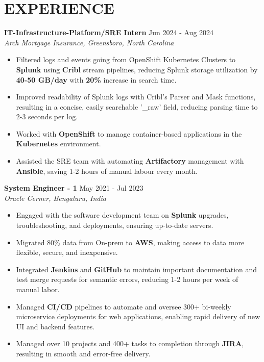 \documentclass[a4paper,9pt]{extarticle}
\begin{document}
\section*{EXPERIENCE}
\noindent
\textbf{IT-Infrastructure-Platform/SRE Intern}
\hfill Jun 2024 - Aug 2024\\ %
\textit{Arch Mortgage Insurance, Greensboro, North Carolina}
\begin{itemize}
    \item Filtered logs and events going from OpenShift Kubernetes Clusters to \textbf{Splunk} using \textbf{Cribl} stream pipelines, reducing Splunk storage utilization by \textbf{40-50 GB/day} with \textbf{20\%} increase in search time.
    \item Improved readability of Splunk logs with Cribl's Parser and Mask functions, resulting in a concise, easily searchable '\_raw' field, reducing parsing time to 2-3 seconds per log.
    \item Worked with \textbf{OpenShift} to manage container-based applications in the \textbf{Kubernetes} environment.
    \item Assisted the SRE team with automating \textbf{Artifactory} management with \textbf{Ansible}, saving 1-2 hours of manual labour every month.
    

\end{itemize}

\noindent
\textbf{System Engineer - 1}
\hfill May 2021 - Jul 2023\\ %
\textit{Oracle Cerner, Bengaluru, India}
\begin{itemize}
    \item Engaged with the software development team on \textbf{Splunk} upgrades, troubleshooting, and deployments, ensuring up-to-date servers.
    \item Migrated 80\% data from On-prem to \textbf{AWS}, making access to data more flexible, secure, and inexpensive.
    \item Integrated \textbf{Jenkins} and \textbf{GitHub} to maintain important documentation and test merge requests for semantic errors, reducing 1-2 hours per week of manual labor.
    \item Managed \textbf{CI/CD} pipelines to automate and oversee 300+ bi-weekly microservice deployments for web applications, enabling rapid delivery of new UI and backend features.
    \item Managed over 10 projects and 400+ tasks to completion through \textbf{JIRA}, resulting in smooth and error-free delivery. 
\end{itemize}
\end{document}
